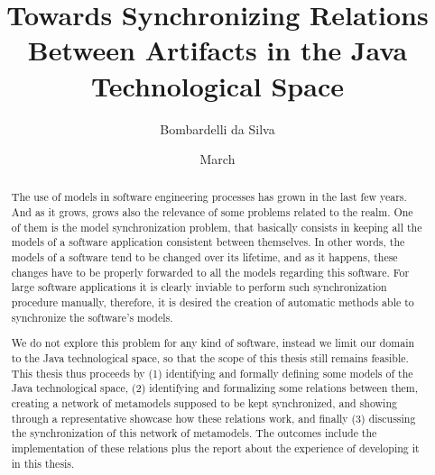 \documentclass[tuberlin,cic,tc,english,noabntcite,oneside]{iiufrgs}
\title{Towards Synchronizing Relations Between Artifacts in the Java Technological Space}
\author{Bombardelli da Silva}{William}
\date{March}{2016}
\begin{document}
\maketitle





\begin{abstract}
The use of models in software engineering processes has grown in the last few years. And as it grows, grows also the relevance of some problems related to the realm. One of them is the model synchronization problem, that basically consists in keeping all the models of a software application consistent between themselves. In other words, the models of a software tend to be changed over its lifetime, and as it happens, these changes have to be properly forwarded to all the models regarding this software. For large software applications it is clearly inviable to perform such synchronization procedure manually, therefore, it is desired the creation of automatic methods able to synchronize the software's models.

We do not explore this problem for any kind of software, instead we limit our domain to the Java technological space, so that the scope of this thesis still remains feasible. This thesis thus proceeds by (1) identifying and formally defining some models of the Java technological space, (2) identifying and formalizing some relations between them, creating a network of metamodels supposed to be kept synchronized, and showing through a representative showcase how these relations work, and finally (3) discussing the synchronization of this network of metamodels. The outcomes include the implementation of these relations plus the report about the experience of developing it in this thesis.
\end{abstract}
\end{document}
